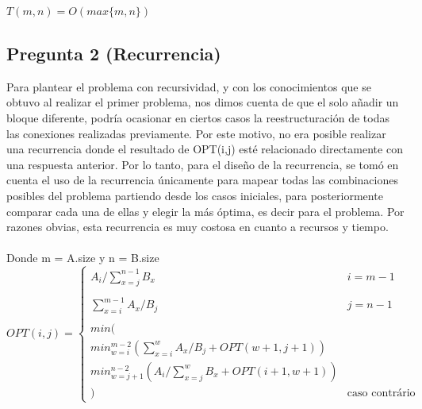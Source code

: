 \documentclass{article}
\begin{document}
	$T(m,n) = O(max\{m,n\})$
	

	\subsection*{Pregunta 2 (Recurrencia)}
	Para plantear el problema con recursividad, y con los conocimientos que se obtuvo al realizar el primer problema, nos dimos cuenta de que el solo añadir un bloque diferente, podría ocasionar en ciertos casos la reestructuración de todas las conexiones realizadas previamente. Por este motivo, no era posible realizar una recurrencia donde el resultado de OPT(i,j) esté relacionado directamente con una respuesta anterior. Por lo tanto, para el diseño de la recurrencia, se tomó en cuenta el uso de la recurrencia únicamente para mapear todas las combinaciones posibles del problema partiendo desde los casos iniciales, para posteriormente comparar cada una de ellas y elegir la más óptima, es decir para el problema. Por razones obvias, esta recurrencia es muy costosa en cuanto a recursos y tiempo.
	\\\\
	Donde m = A.size y n = B.size
	\begin{equation*}
	OPT(i,j) =
	\begin{cases}
	A_i / \sum_{x=j}^{n-1}B_x & i = m-1\\\\
	\sum_{x=i}^{m-1}A_x / B_j & j = n-1\\\\
	min(\\
	min_{w=i}^{m-2}( \sum_{x=i}^{w}A_x/ B_j + OPT(w+1, j+1))\\
	min_{w=j+1}^{n-2}(A_i/\sum_{x=j}^{w}B_x + OPT(i+1,w+1))\\
	) & \text{caso contrário}
	\end{cases}
	\end{equation*}
\end{document}
